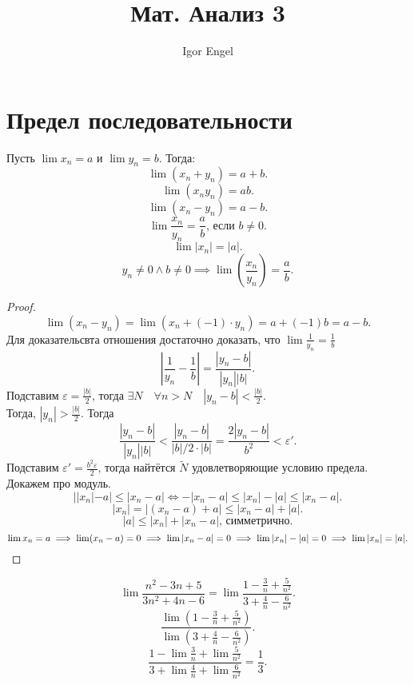 \documentclass[11pt, oneside]{article}   	%
\title{Мат. Анализ 3}
\author{Igor Engel}
\date{}
\begin{document}
\maketitle
\section{Предел последовательности}
    
\begin{theorem}
    Пусть $\lim x_n=a$ и  $\lim y_n = b$. Тогда:
    \[ \lim \left( x_n+y_n \right) =a+b .\]
    \[ \lim \left( x_ny_n \right) =ab .\]
    \[ \lim\left( x_n-y_n \right)=a-b  .\]
    \[ \lim \frac{x_n}{y_n} = \frac{a}{b}\text{, если $b\neq 0$} .\]
    \[\lim |x_n|=|a| .\] 
    \[ y_n \neq 0\land b\neq 0 \implies \lim\left( \frac{x_n}{y_n} \right) = \frac{a}{b} .\]
    \begin{proof}
        \[ \lim (x_n-y_n) = \lim(x_n+(-1)\cdot y_n) = a+(-1)b=a-b .\]
        Для доказательсвта отношения достаточно доказать, что $\lim \frac{1}{y_n} = \frac{1}{b}$
        \[ \left|\frac{1}{y_n}-\frac{1}{b}\right|=\frac{|y_n-b|}{|y_n| |b|} .\]
        Подставим $\varepsilon = \frac{|b|}{2}$, тогда $\exists{N}\quad \forall{n > N}\quad |y_n-b|<\frac{|b|}{2}$.\\
        Тогда, $|y_n| > \frac{|b|}{2}$. Тогда
        \[ \frac{|y_n-b|}{|y_n| |b|} < \frac{|y_n-b|}{|b| / 2\cdot |b|} = \frac{2|y_n-b|}{b^2} < \varepsilon'.\]
        Подставим $\varepsilon'=\frac{b^2\varepsilon}{2}$, тогда найтётся $ \tilde{N}$ удовлетворяющие условию предела.\\
        Докажем про модуль. 
        \[ | |x_n|-a| \le |x_n-a| \iff -|x_n-a| \le |x_n|-|a|\le |x_n-a|.\]
        \[ |x_n|=|(x_n-a)+a| \le |x_n-a|+|a| .\]
        \[ |a| \le  |x_n|+|x_n-a|\text{, симметрично} .\]
        \[ \lim x_n=a \implies \lim (x_n-a) = 0 \implies \lim |x_n-a| = 0 \implies \lim |x_n|-|a| = 0 \implies \lim |x_n| = |a| .\qedhere\] 
    \end{proof} 
\end{theorem}
\begin{example}
\[ \lim \frac{n^2-3n+5}{3n^2+4n-6}=\lim \frac{1-\frac{3}{n}+\frac{5}{n^2}}{3+\frac{4}{n}-\frac{6}{n^2}} .\]
\[ \frac{\lim (1-\frac{3}{n}+\frac{5}{n^2})}{\lim (3+\frac{4}{n}-\frac{6}{n^2})}.\]
\[ \frac{1-\lim \frac{3}{n} + \lim \frac{5}{n^2}}{3+\lim \frac{4}{n} + \lim \frac{6}{n^2}} = \frac{1}{3} .\] 
    
\end{example}
\end{document}
